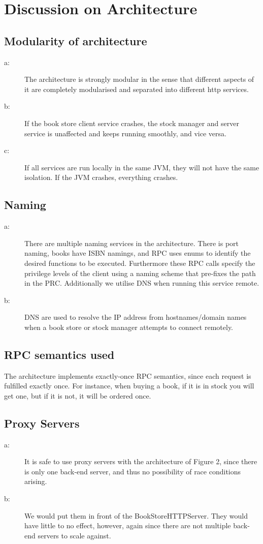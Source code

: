 \chapter{Discussion on Architecture}

\section{Modularity of architecture}
\begin{description}
\item[a:] The architecture is strongly modular in the sense that different aspects of it are completely modularised and separated into different http services.
\item[b:] If the book store client service crashes, the stock manager and server service is unaffected and keeps running smoothly, and vice versa.
\item[c:] If all services are run locally in the same JVM, they will not have the same isolation. If the JVM crashes, everything crashes.
\end{description}

\section{Naming}
\begin{description}
\item[a:] There are multiple naming services in the architecture. There is port naming, books have ISBN namings, and RPC uses enums to identify the desired functions to be executed. Furthermore these RPC calls specify the privilege levels of the client using a naming scheme that pre-fixes the path in the PRC. Additionally we utilise DNS when running this service remote.
\item[b:] DNS are used to resolve the IP address from hostnames/domain names when a book store or stock manager attempts to connect remotely.
\end{description}

\section{RPC semantics used}
The architecture implements exactly-once RPC semantics, since each request is fulfilled exactly once. For instance, when buying a book, if it is in stock you will get one, but if it is not, it will be ordered once.

\section{Proxy Servers}
\begin{description}
\item[a:] It is safe to use proxy servers with the architecture of Figure 2, since there is only one back-end server, and thus no possibility of race conditions arising.
\item[b:] We would put them in front of the BookStoreHTTPServer. They would have little to no effect, however, again since there are not multiple back-end servers to scale against.
\end{description}

